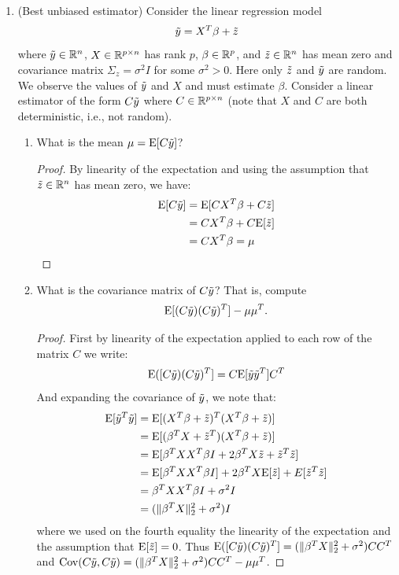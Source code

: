 \documentclass[12pt,twoside]{article}
\begin{document}
\begin{enumerate}
\item (Best unbiased estimator) Consider the linear regression model
  $$\tilde{  y } = X^T\beta + \tilde{  z }$$
  where $\tilde{  y }\in\mathbb{R}^n$, $X\in\mathbb{R}^{p \times n}$ has rank $p$,
  $\beta\in\mathbb{R}^p$, and $\tilde{  z }\in\mathbb{R}^n$ has mean
  zero and covariance matrix $\Sigma_{z}=\sigma^2I$ for some
  $\sigma^2>0$.  Here only $\tilde{  z }$ and $\tilde{  y }$ are random.  We observe
  the values of $\tilde{  y }$ and $X$ and must estimate $\beta$.
  Consider a linear estimator of the form $C\tilde{  y }$
  where $C\in\mathbb{R}^{p\times n}$ (note that $X$ and $C$ are both
  deterministic, i.e., not random).
  \begin{enumerate}
  \item What is the mean $\mu=\mathrm{E}[C\tilde{  y }]$?

\begin{proof}
  
  	By linearity of the expectation and using the assumption that  $\tilde{  z }\in\mathbb{R}^n$ has mean
  zero, we have:
  	\begin{align*}
		\mathrm{E}[C\tilde{  y }]	&=	\mathrm{E}[C X^T \beta + C \tilde{  z }]	\\
				&= 	C X^T \beta  + C \mathrm{E}[\tilde{  z }]	\\
				&=	C X^T \beta = \mu
	\end{align*}
  \end{proof}  
  
  
  \item What is the covariance matrix of $C\tilde{  y }$? That is, compute
    $$\mathrm{E}[(C\tilde{  y })(C\tilde{  y })^T]-\mu\mu^T.$$

\begin{proof}
 	First by linearity of the expectation applied to each row of the matrix $C$ we write:
	$$\mathrm{E}([C \tilde{  y }) (C\tilde{  y })^T] = C \mathrm{E}[\tilde{  y } \tilde{  y }^T] C^T$$
	And expanding the covariance of $\tilde{  y }$, we note that:
  	\begin{align*}
		 \mathrm{E}[\tilde{  y }^T \tilde{  y }] 	&= 	\mathrm{E}[(X^T\beta + \tilde{  z })^T (X^T\beta + \tilde{  z })] \\
		 			&=	\mathrm{E}[(\beta^T X + \tilde{  z }^T) (X^T\beta + \tilde{  z })] \\
					&=	\mathrm{E}[\beta^T X X^T \beta I + 2 \beta^T X \tilde{  z } + \tilde{  z }^T \tilde{  z }] \\
					&=	\mathrm{E}[\beta^T X X^T \beta I] + 2 \beta^T X \mathrm{E}[\tilde{  z }] + E[\tilde{  z }^T \tilde{  z }] \\
					&=	\beta^T X X^T \beta I + \sigma^2 I \\
					&= 	(\|\beta^T X\|_2^2 + \sigma^2) I
	\end{align*}
	where we used on the fourth equality the linearity of the expectation and the assumption that $\mathrm{E}[\tilde{  z }]=0$.
	Thus $\mathrm{E}([C \tilde{  y }) (C\tilde{  y })^T] = (\|\beta^T X\|_2^2 + \sigma^2) C C^T$ and $\mathrm{Cov}(C\tilde{  y }, C\tilde{  y }) =  (\|\beta^T X\|_2^2 + \sigma^2) C C^T - \mu\mu^T$.
\end{proof}  	    
    

\end{enumerate}
\end{enumerate}
\end{document}
